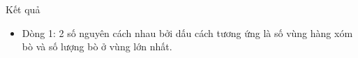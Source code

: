 Kết quả
\begin{itemize}
	\item     Dòng 1: 2 số nguyên cách nhau bởi dấu cách tương ứng là số   vùng hàng xóm bò và số lượng bò ở vùng lớn nhất.   
\end{itemize}